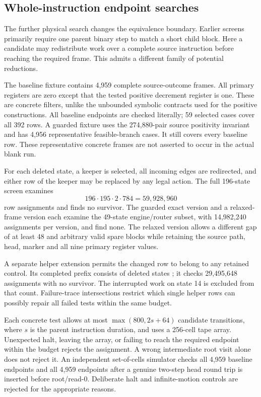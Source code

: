 \subsection{Whole-instruction endpoint searches}

The further physical search changes the equivalence boundary. Earlier
screens primarily require one parent binary step to match a short child
block. Here a candidate may redistribute work over a complete source
instruction before reaching the required frame. This admits a different
family of potential reductions.

The baseline fixture contains 4,959 complete source-outcome frames. All
primary registers are zero except that the tested positive decrement
register is one. These are concrete filters, unlike the unbounded
symbolic contracts used for the positive constructions. All baseline
endpoints are checked literally; 59 selected cases cover all 392 rows.
A guarded fixture uses the 274,880-pair source positivity invariant and
has 4,956 representative feasible-branch cases. It still covers every
baseline row. These representative concrete frames are not asserted to
occur in the actual blank run.

For each deleted state, a keeper is selected, all incoming edges are
redirected, and either row of the keeper may be replaced by any legal
action. The full 196-state screen examines
\[
                 196\cdot195\cdot2\cdot784=59,928,960
\]
row assignments and finds no survivor. The guarded exact version and a
relaxed-frame version each examine the 49-state engine/router subset,
with 14,982,240 assignments per version, and find none.
The relaxed version allows a different gap of at least 48 and arbitrary
valid spare blocks while retaining the source path, head, marker and
all nine primary register values.

A separate helper extension permits the changed row to belong to any
retained control. Its completed prefix consists of deleted states
; it checks 29,495,648 assignments with no
survivor. The interrupted work on state 14 is excluded from that count.
Failure-trace intersections restrict which single helper rows can
possibly repair all failed tests within the same budget.

Each concrete test allows at most
$\max(800,2s+64)$ candidate transitions, where $s$ is the parent
instruction duration, and uses a 256-cell tape array. Unexpected halt,
leaving the array, or failing to reach the required endpoint within the
budget rejects the assignment. A wrong intermediate root visit alone
does not reject it. An independent set-of-cells simulator checks all
4,959 baseline endpoints and all 4,959 endpoints after a genuine two-step
head round trip is inserted before root/read-0. Deliberate halt and
infinite-motion controls are rejected for the appropriate reasons.

